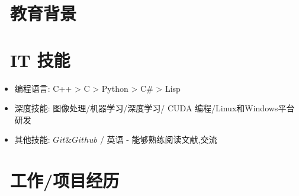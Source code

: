 \documentclass{resume}
\begin{document}


\section{\faGraduationCap\  教育背景}

\section{\faCogs\ IT 技能}
\begin{itemize}[parsep=0.5ex]
  \item 编程语言: C++ > C > Python > C\# > Lisp
  \item 深度技能: 图像处理/机器学习/深度学习/ CUDA 编程/Linux和Windows平台研发
  \item 其他技能: $Git\& Github$ / 英语 - 能够熟练阅读文献,交流
\end{itemize}

\section{\faUsers\ 工作/项目经历}
\end{document}
